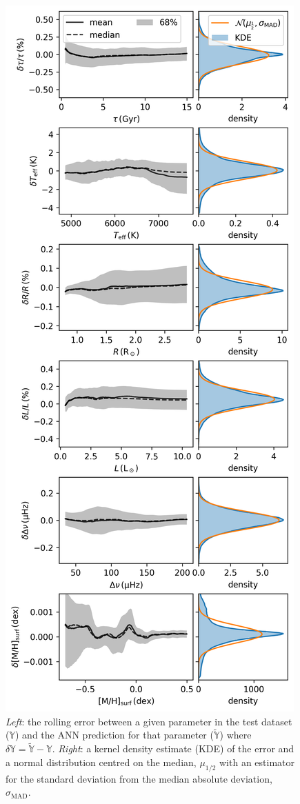\documentclass[a4paper,fleqn,usenatbib]{mnras}
\begin{document}
\begin{figure}
    \centering
    \includegraphics[width=\linewidth]{figures/test_random.png}
    \caption{\emph{Left}: the rolling error between a given parameter in the test dataset ($\mathbb{Y}$) and the ANN prediction for that parameter ($\widetilde{\mathbb{Y}}$) where $\delta \mathbb{Y} = \widetilde{\mathbb{Y}} - \mathbb{Y}$. \emph{Right}: a kernel density estimate (KDE) of the error and a normal distribution centred on the median, $\mu_{1/2}$ with an estimator for the standard deviation from the median absolute deviation, $\sigma_\mathrm{MAD}$.}
    \label{fig:test}
\end{figure}
\end{document}
